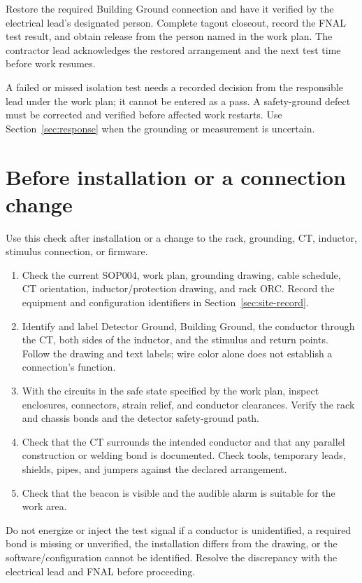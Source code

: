 \documentclass[11pt]{article}
\begin{document}
Restore the required Building Ground connection and have it verified by the electrical lead's designated person. Complete tagout closeout, record the FNAL test result, and obtain release from the person named in the work plan. The contractor lead acknowledges the restored arrangement and the next test time before work resumes.

A failed or missed isolation test needs a recorded decision from the responsible lead under the work plan; it cannot be entered as a pass. A safety-ground defect must be corrected and verified before affected work restarts. Use Section~\ref{sec:response} when the grounding or measurement is uncertain.

\section{Before installation or a connection change}

Use this check after installation or a change to the rack, grounding, CT, inductor, stimulus connection, or firmware.

\begin{enumerate}
  \item Check the current SOP004, work plan, grounding drawing, cable schedule, CT orientation, inductor/protection drawing, and rack ORC. Record the equipment and configuration identifiers in Section~\ref{sec:site-record}.
  \item Identify and label Detector Ground, Building Ground, the conductor through the CT, both sides of the inductor, and the stimulus and return points. Follow the drawing and text labels; wire color alone does not establish a connection's function.
  \item With the circuits in the safe state specified by the work plan, inspect enclosures, connectors, strain relief, and conductor clearances. Verify the rack and chassis bonds and the detector safety-ground path.
  \item Check that the CT surrounds the intended conductor and that any parallel construction or welding bond is documented. Check tools, temporary leads, shields, pipes, and jumpers against the declared arrangement.
  \item Check that the beacon is visible and the audible alarm is suitable for the work area.
\end{enumerate}

Do not energize or inject the test signal if a conductor is unidentified, a required bond is missing or unverified, the installation differs from the drawing, or the software/configuration cannot be identified. Resolve the discrepancy with the electrical lead and FNAL before proceeding.
\end{document}
